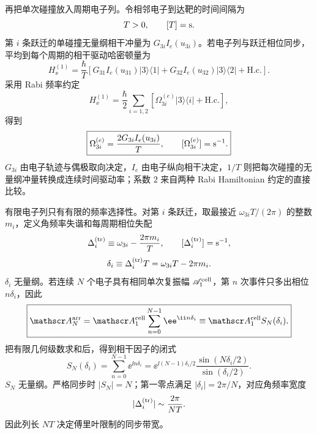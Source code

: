 再把单次碰撞放入周期电子列。令相邻电子到达靶的时间间隔为
\begin{equation*}
T>0,
\qquad [T]={\rm s}.
\end{equation*}
第 $i$ 条跃迁的单碰撞无量纲相干冲量为 $G_{3i}I_e(u_{3i})$。若电子列与跃迁相位同步，平均到每个周期的相干驱动哈密顿量为
\begin{equation}
\boxed{
H_\ee^{(1)}
=\frac{\hbar}{T}
\left[
G_{31}I_e(u_{31})|3\rangle\langle1|
+G_{32}I_e(u_{32})|3\rangle\langle2|
+\mathrm{H.c.}
\right].}
\label{eq:electron_train_average_hamiltonian_dp68}
\end{equation}
采用 Rabi 频率约定
\begin{equation*}
H_\ee^{(1)}
=\frac{\hbar}{2}
\sum_{i=1,2}
[\Omega_{3i}^{(e)}|3\rangle\langle i|+\mathrm{H.c.}],
\end{equation*}
得到
\begin{equation}
\boxed{
\Omega_{3i}^{(e)}
=\frac{2G_{3i}I_e(u_{3i})}{T},
\qquad
[\Omega_{3i}^{(e)}]={\rm s^{-1}}.}
\label{eq:wu2026_effective_electron_rabi_frequency}
\end{equation}
$G_{3i}$ 由电子轨迹与偶极取向决定，$I_e$ 由电子纵向相干决定，$1/T$ 则把每次碰撞的无量纲冲量转换成连续时间驱动率；系数 $2$ 来自两种 Rabi Hamiltonian 约定的直接比较。

有限电子列只有有限的频率选择性。对第 $i$ 条跃迁，取最接近 $\omega_{3i}T/(2\pi)$ 的整数 $m_i$，定义角频率失谐和每周期相位失配
\begin{equation*}
\Delta_i^{({\rm tr})}
\equiv\omega_{3i}-\frac{2\pi m_i}{T},
\qquad
[\Delta_i^{({\rm tr})}]={\rm s^{-1}},
\end{equation*}
\begin{equation*}
\delta_i\equiv\Delta_i^{({\rm tr})}T
=\omega_{3i}T-2\pi m_i.
\end{equation*}
$\delta_i$ 无量纲。若连续 $N$ 个电子具有相同单次复振幅 $\mathscr A_1^{\rm cell}$，第 $n$ 次事件只多出相位 $n\delta_i$，因此
\begin{equation}
\boxed{
\mathscr A_N^{\rm arr}
=\mathscr A_1^{\rm cell}\sum_{n=0}^{N-1}\ee^{\ii n\delta_i}
\equiv\mathscr A_1^{\rm cell} S_N(\delta_i).}
\label{eq:electron_train_phase_sum_dp68}
\end{equation}
把有限几何级数求和后，得到相干因子的闭式
\begin{equation}
\boxed{
S_N(\delta_i)
=\sum_{n=0}^{N-1}\ee^{\ii n\delta_i}
=\ee^{\ii(N-1)\delta_i/2}
\frac{\sin(N\delta_i/2)}{\sin(\delta_i/2)}.}
\label{eq:electron-train-coherence-factor-dp32}
\end{equation}
$S_N$ 无量纲。严格同步时 $|S_N|=N$；第一零点满足 $|\delta_i|=2\pi/N$，对应角频率宽度
\begin{equation*}
|\Delta_i^{({\rm tr})}|
\sim\frac{2\pi}{NT}.
\end{equation*}
因此列长 $NT$ 决定傅里叶限制的同步带宽。

